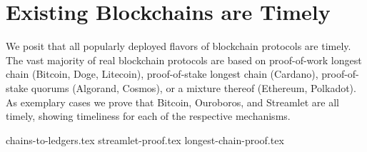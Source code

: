 \section{Existing Blockchains are Timely}\label{sec:possible}

We posit that all popularly deployed flavors of blockchain protocols are timely.
The vast majority of real blockchain protocols are based on proof-of-work longest chain
(Bitcoin, Doge, Litecoin),
proof-of-stake longest chain
(Cardano),
proof-of-stake quorums
(Algorand, Cosmos),
or a mixture thereof
(Ethereum, Polkadot). As exemplary cases we prove that Bitcoin, Ouroboros, and Streamlet
are all timely, showing timeliness for each of the respective mechanisms.

{chains-to-ledgers.tex}
{streamlet-proof.tex}
{longest-chain-proof.tex}

